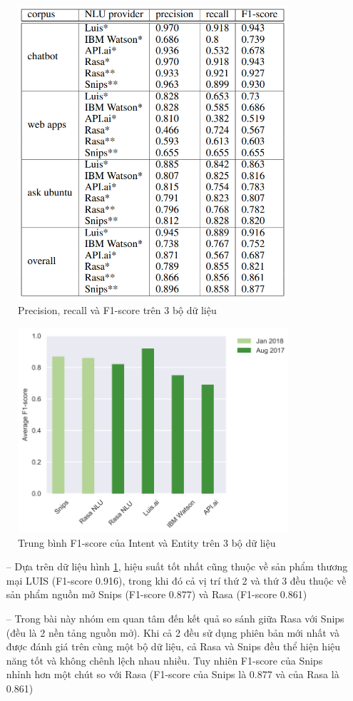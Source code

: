 \begin{figure}[htp]
    \centering
    \includegraphics[width=10cm]{images/comparisonimg/benchmark2017and2018.png}
    \caption{Precision, recall và F1-score trên 3 bộ dữ liệu}
    \label{fig:benchmark2017and2018}
\end{figure}

\begin{figure}[htp]
    \centering
    \includegraphics[width=10cm]{images/comparisonimg/averageF1-scores.png}
    \caption{Trung bình F1-score của Intent và Entity trên 3 bộ dữ liệu}
    \label{fig:averageF1-scores}
\end{figure}

\begin{itemize}
    \item[--] Dựa trên dữ liệu hình \ref{fig:benchmark2017and2018}, hiệu suất tốt nhất cũng thuộc về sản phẩm thương mại LUIS (F1-score 0.916), trong khi đó cả vị trí thứ 2 và thứ 3 đều thuộc về sản phẩm nguồn mở Snips (F1-score 0.877) và Rasa  (F1-score 0.861)
    \item[--] Trong bài này nhóm em quan tâm đến kết quả so sánh giữa Rasa với Snips (đều là 2 nền tảng nguồn mở). Khi cả 2 đều sử dụng phiên bản mới nhất và được đánh giá trên cùng một bộ dữ liệu, cả Rasa và Snips đều thể hiện hiệu năng tốt và không chênh lệch nhau nhiều. Tuy nhiên F1-score của Snips nhỉnh hơn một chút so với Rasa (F1-score của Snips là 0.877 và của Rasa là 0.861)
\end{itemize}

